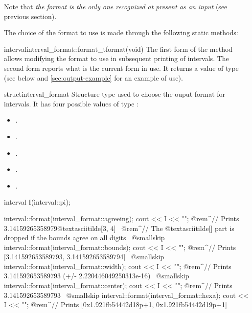 \documentclass{manual}
\begin{document}
\medskip
Note that \emph{the  format is the only one recognized at present as an input} (see previous section).
\medskip

The choice of the format to use is made through the following static methods:

\begin{defstaticmethod}{interval}{interval\_format::format\_t}{format}{(void)}
  The first form of the method allows modifying the format to use in subsequent
  printing of intervals. The second form reports what is the current form in use.
  It returns a value of  type 
  (see below and \ref{sec:output-example} for an example of use).
\end{defstaticmethod}

\begin{deftype}{struct}{interval\_format}
  Structure type used to choose the ouput format for intervals. It has
  four possible values of type :
\begin{itemize}
\item {}.
\item {}.
\item {}.
\item {}.
\item {}.
\end{itemize}
\end{deftype}

\begin{example}
  interval I(interval::pi);

  interval::format(interval_format::agreeing);
  cout << I << "\n";
  @rem^// Prints 3.14159265358979@textasciitilde[3, 4]~
  @rem^// The @textasciitilde[] part is dropped if the bounds agree on all digits~
  @smallskip
  interval::format(interval_format::bounds);
  cout << I << "\n";
  @rem^// Prints [3.141592653589793, 3.141592653589794]~
  @smallskip
  interval::format(interval_format::width);
  cout << I << "\n";
  @rem^// Prints 3.141592653589793 (+/- 2.220446049250313e-16)~
  @smallskip
  interval::format(interval_format::center);
  cout << I << "\n";
  @rem^// Prints 3.141592653589793~
  @smallskip
  interval::format(interval_format::hexa);
  cout << I << "\n";
  @rem^// Prints [0x1.921fb54442d18p+1, 0x1.921fb54442d19p+1]~
\end{example}
\end{document}
